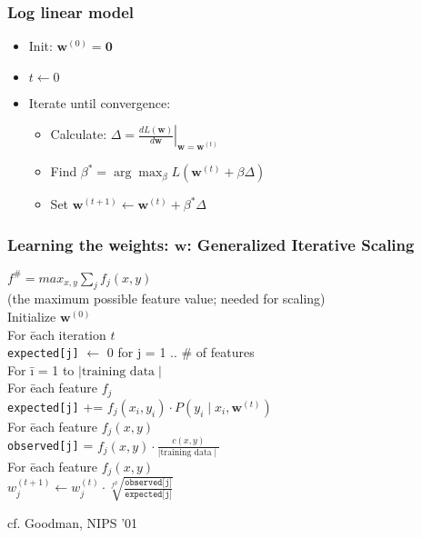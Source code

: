 \begin{frame}
\frametitle{Log linear model}
\begin{itemize}[<+->]
\item Init: $\textbf{w}^{(0)} = \textbf{0}$
\item $t \leftarrow 0$
\item Iterate until convergence:
\begin{itemize}[<+->]
\item Calculate: $\Delta = \left. \frac{d L(\textbf{w})}{d \textbf{w}}  \right|_{\textbf{w} = \textbf{w}^{(t)}}$
\item Find $\beta^\ast = \arg\max_\beta L(\textbf{w}^{(t)} + \beta \Delta)$
\item Set $\textbf{w}^{(t+1)} \leftarrow \textbf{w}^{(t)} + \beta^\ast \Delta$
\end{itemize}
\end{itemize}
\end{frame}

\begin{frame}
\frametitle{Learning the weights: $\textbf{w}$: Generalized Iterative
  Scaling}
\begin{tabbing}
$f^\# = max_{x,y} \sum_{j} f_j(x, y)$ \\
(the maximum possible feature value; needed for scaling) \pause \\
Initialize $\textbf{w}^{(0)}$ \pause \\
For \= each iteration $t$ \\
\> \texttt{expected[j]} $\leftarrow$ 0 for j = 1 .. \# of features \pause \\
\> For \= i = 1 to $\mid \textrm{training data} \mid$ \\
\>     \> For \= each feature $f_j$ \\
\>     \>     \> \texttt{expected[j]} += $f_j(x_i, y_i) \cdot P(y_i \mid x_i, \textbf{w}^{(t)})$ \pause \\
\> For \= each feature $f_j(x,y)$ \\
\>     \> \texttt{observed[j]} = $f_j(x, y) \cdot \frac{c(x,y)}{\mid \textrm{training data} \mid}$ \pause \\ 
\> For \= each feature $f_j(x,y)$ \\
\>     \> $w_j^{(t+1)} \leftarrow w_j^{(t)} \cdot \sqrt[f^\#]{\frac{\texttt{observed[j]}}{\texttt{expected[j]}}}$ 
\end{tabbing}
\par\noindent
\small{cf. Goodman, NIPS '01}
\end{frame} 

